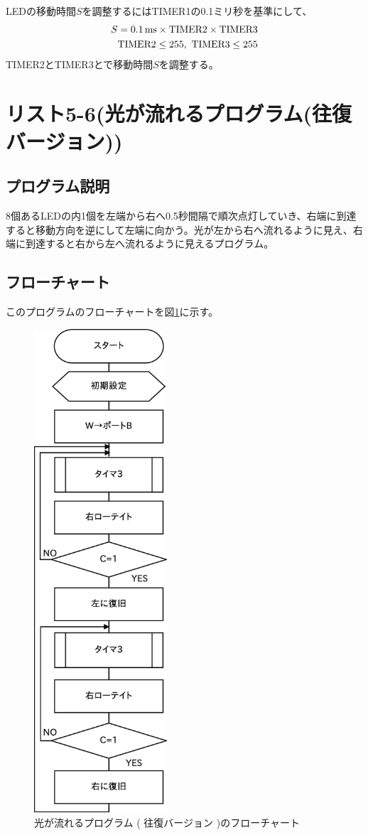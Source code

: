 \documentclass[a4paper,12pt]{ujarticle}
\begin{document}
      LEDの移動時間$S$を調整するにはTIMER1の0.1ミリ秒を基準にして、
      \begin{eqnarray*}
       S = \SI{0.1}{\milli\second} \times {\rm TIMER2 \times TIMER3} \\
       {\rm TIMER2 \le 255},\ {\rm TIMER3 \le 255}
      \end{eqnarray*}
      TIMER2とTIMER3とで移動時間$S$を調整する。
      \clearpage
 \section{リスト5-6(光が流れるプログラム(往復バージョン))}
  \subsection{プログラム説明}
  8個あるLEDの内1個を左端から右へ0.5秒間隔で順次点灯していき、右端に到達すると移動方向を逆にして左端に向かう。光が左から右へ流れるように見え、右端に到達すると右から左へ流れるように見えるプログラム。
  \subsection{フローチャート}
  このプログラムのフローチャートを図\ref{fig:flow_5-6}に示す。
  \begin{figure}[htbp]
   \begin{center}
    \includegraphics[height=180mm]{Diagram5-6.eps}
   \end{center}
   \caption{光が流れるプログラム ( 往復バージョン )のフローチャート}
   \label{fig:flow_5-6}
  \end{figure}
  \clearpage
\end{document}
